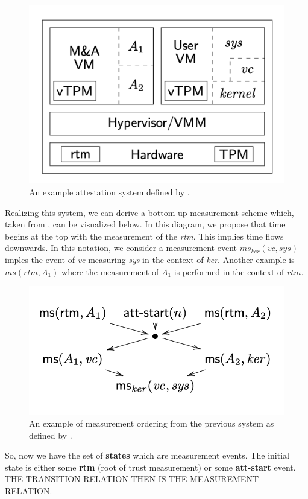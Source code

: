 \documentclass[12pt, letterpaper]{article}
\begin{document}
\begin{figure}[hbtp]
  \centering
  \includegraphics[scale=.5]{AttSystemRowe.png}
  \caption{An example attestation system defined by \cite{Rowe::Bundling}.}
  \label{att-system-rowe}
\end{figure}

Realizing this system, we can derive a bottom up measurement scheme which, taken from \cite{Rowe::Bundling}, can be visualized below. In this diagram, we propose that time begins at the top with the measurement of  the \emph{rtm}. This implies time flows downwards. In this notation, we consider a measurement event $ms_{ker}(vc,sys)$ imples the event of \emph{vc} measuring \emph{sys} in the context of \emph{ker}. Another example is $ms(rtm,A_1)$ where the measurement of $A_1$ is performed in the context of $rtm$. 

\begin{figure}[hbtp]
  \centering
  \includegraphics[scale=.5]{MeasOrdRowe.png}
  \caption{An example of measurement ordering from the previous system as defined by \cite{Rowe::Bundling}.}
  \label{meas-ord-rowe}
\end{figure}

So, now we have the set of \textbf{states} which are measurement events. The initial state is either some \textbf{rtm} (root of trust measurement) or some \textbf{att-start} event. THE TRANSITION RELATION THEN IS THE MEASUREMENT RELATION. 



\end{document}

